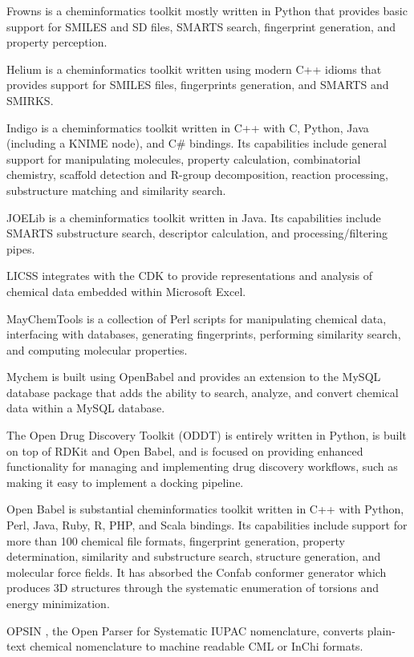 Frowns is a cheminformatics toolkit mostly written in Python that provides basic support for SMILES and SD files, SMARTS search, fingerprint generation, and property perception.

Helium is a cheminformatics toolkit written using modern C++ idioms that provides support for SMILES files, fingerprints generation, and SMARTS and SMIRKS.

Indigo \cite{Pavlov_2011} is a cheminformatics toolkit written in C++ with C, Python, Java (including a KNIME node), and C\# bindings.  Its capabilities include general support for manipulating molecules, property calculation, combinatorial chemistry, scaffold detection and R-group decomposition, reaction processing, substructure matching and similarity search.

JOELib is a cheminformatics toolkit written in Java. Its capabilities include SMARTS substructure search, descriptor calculation, and processing/filtering pipes.

LICSS \cite{Lawson_2012} integrates with the CDK to provide representations and analysis of chemical data embedded within Microsoft Excel.

MayChemTools is a collection of Perl scripts for manipulating chemical data, interfacing with databases, generating fingerprints, performing similarity search, and computing molecular properties.

Mychem is built using OpenBabel and provides an extension to the MySQL database package that adds the ability to search, analyze, and convert chemical data within a MySQL database.

The Open Drug Discovery Toolkit (ODDT) \cite{W_jcikowski_2015} is entirely written in Python, is built on top of RDKit and Open Babel, and is focused on providing enhanced functionality for managing and implementing drug discovery workflows, such as making it easy to implement a docking pipeline. 

Open Babel \cite{openbabel} is substantial cheminformatics toolkit written in C++ with Python, Perl, Java, Ruby, R, PHP, and Scala bindings.  Its capabilities include support for more than 100 chemical file formats, fingerprint generation, property determination, similarity and substructure search, structure generation, and molecular force fields.  It has absorbed the Confab \cite{confab} conformer generator which produces 3D structures through the systematic enumeration of torsions and energy minimization.

OPSIN \cite{Lowe_2011}, the Open Parser for Systematic IUPAC nomenclature, converts plain-text chemical nomenclature to machine readable CML or InChi formats.

